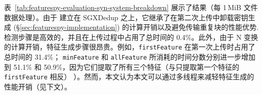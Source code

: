 \begin{table}[t]
    \small
    \centering
    \setlength{\tabcolsep}{5pt}
    \renewcommand{\arraystretch}{1.05}
    \caption{(Exp\#5) 处理合成文件数据每 1\,MiB 的时间分解（单位：ms）。 除括号中明确指定外，第二次上传的每一步所消耗的时间与第一次上传的相同。}
    \label{tab:featurespy-evaluation-syn-system-breakdown}
    \vspace{-6pt}
\end{table}
表~\ref{tab:featurespy-evaluation-syn-system-breakdown} 展示了结果（每 1\,MiB 文件数据处理）。由于 \prototype 建立在 SGXDedup \cite{ren21} 之上，它继承了在第二次上传中卸载密钥生成 (\S\ref{sec:featurespy-implementation}) 的计算开销以及避免传输重复块的性能优势.检测步骤是高效的，并且在上传过程中占用了总时间的 0.4\%。此外，由于 N 变换的计算开销，特征生成步骤很昂贵。例如，{\tt firstFeature} 在第一次上传时占用了总时间的 31.4\%； {\tt minFeature} 和 {\tt allFeature} 所消耗的时间分数分别进一步增加到 51.1\% 和 50.9\%，因为它们提取了所有三个特征（与只提取第一个特征的 {\tt firstFeature} 相反） ）。然而，本文认为本文可以通过多线程来减轻特征生成的性能开销（见下文）。


